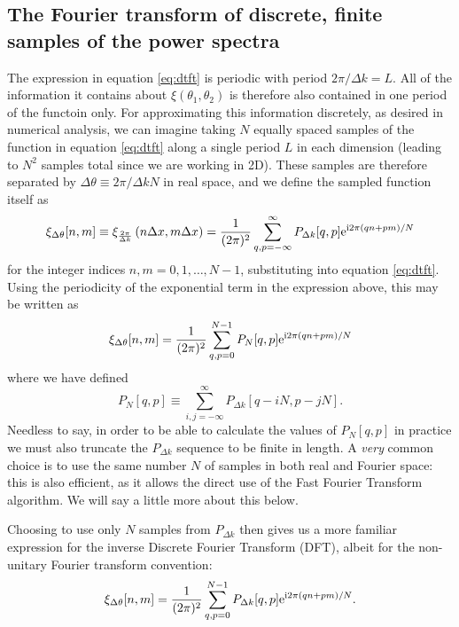 \documentclass[preprint]{aastex}
\newcommand{\mi}{{\rm i}}
\newcommand{\me}{{\rm e}}
\begin{document}
\subsection{The Fourier transform of discrete, finite samples of the power spectra}
The expression in equation \eqref{eq:dtft} is periodic with period $2
\pi / \Delta k = L$.  All of the information it contains about
$\xi(\theta_1, \theta_2)$ is therefore also contained in one period
of the functoin only.  For approximating this information discretely, as desired in
numerical analysis, we can imagine taking $N$ equally spaced samples of
the function in equation \eqref{eq:dtft} along a single period $L$ in each
dimension (leading to $N^2$ samples total since we are working in 2D).
These samples are therefore separated by $\Delta \theta \equiv 2 \pi /
\Delta k N$ in real space, and we define the sampled
function itself as
\begin{equation}
\xi_{\Delta \theta}[n, m] \equiv \xi_{\frac{2 \pi}{\Delta
    k}} \left( n \Delta x, m \Delta x\right) = \frac{1}{( 2 \pi)^2}
\sum_{q,p=-\infty}^{\infty} P_{\Delta k} [q, p] \me^{\mi 2 \pi (qn +
  pm) / N}
\end{equation}
for the integer indices $n, m = 0, 1, \ldots, N-1$, substituting into equation
\eqref{eq:dtft}.  Using the periodicity of the exponential term in the
expression above, this may be written as
\begin{equation}
\xi_{\Delta \theta}[n, m] = \frac{1}{( 2 \pi)^2}
\sum_{q,p=0}^{N-1} P_N [q, p] \me^{\mi 2 \pi (qn +
  pm) / N}
\end{equation}
where we have defined
\begin{equation}
P_N[q, p] \equiv \sum_{i,j=-\infty}^{\infty}  P_{\Delta k} [q - i N, p
- j N] .
\end{equation}
Needless to say, in order to be able to calculate the values of
$P_N[q, p]$ in practice we must also truncate the 
$P_{\Delta k}$ sequence to be finite in length.  A \emph{very} common
choice is to use the same number $N$ of samples in both real and
Fourier space: this is also efficient, as it allows the direct use of
the Fast Fourier Transform algorithm.  We will say a little more about
this below.

Choosing to use only $N$
samples from $P_{\Delta k}$ then gives us a more
familiar expression for the inverse Discrete Fourier Transform (DFT),
albeit for the non-unitary Fourier transform convention:
\begin{equation}
\xi_{\Delta \theta}[n, m] = \frac{1}{( 2 \pi)^2}
\sum_{q,p=0}^{N-1} P_{\Delta k} [q, p] \me^{\mi 2 \pi (qn +
  pm) / N}. \label{eq:dft}
\end{equation}
\end{document}
